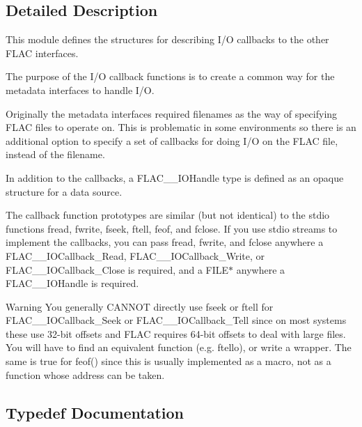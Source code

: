 \subsection{Detailed Description}
This module defines the structures for describing I/O callbacks to the other F\+L\+AC interfaces. 

The purpose of the I/O callback functions is to create a common way for the metadata interfaces to handle I/O.

Originally the metadata interfaces required filenames as the way of specifying F\+L\+AC files to operate on. This is problematic in some environments so there is an additional option to specify a set of callbacks for doing I/O on the F\+L\+AC file, instead of the filename.

In addition to the callbacks, a F\+L\+A\+C\+\_\+\+\_\+\+I\+O\+Handle type is defined as an opaque structure for a data source.

The callback function prototypes are similar (but not identical) to the stdio functions fread, fwrite, fseek, ftell, feof, and fclose. If you use stdio streams to implement the callbacks, you can pass fread, fwrite, and fclose anywhere a F\+L\+A\+C\+\_\+\+\_\+\+I\+O\+Callback\+\_\+\+Read, F\+L\+A\+C\+\_\+\+\_\+\+I\+O\+Callback\+\_\+\+Write, or F\+L\+A\+C\+\_\+\+\_\+\+I\+O\+Callback\+\_\+\+Close is required, and a F\+I\+L\+E$\ast$ anywhere a F\+L\+A\+C\+\_\+\+\_\+\+I\+O\+Handle is required. \begin{DoxyWarning}{Warning}
You generally C\+A\+N\+N\+OT directly use fseek or ftell for F\+L\+A\+C\+\_\+\+\_\+\+I\+O\+Callback\+\_\+\+Seek or F\+L\+A\+C\+\_\+\+\_\+\+I\+O\+Callback\+\_\+\+Tell since on most systems these use 32-\/bit offsets and F\+L\+AC requires 64-\/bit offsets to deal with large files. You will have to find an equivalent function (e.\+g. ftello), or write a wrapper. The same is true for feof() since this is usually implemented as a macro, not as a function whose address can be taken. 
\end{DoxyWarning}


\subsection{Typedef Documentation}
\mbox{\label{group__flac__callbacks_ga0032267fac38220689778833e08f7387}} 
